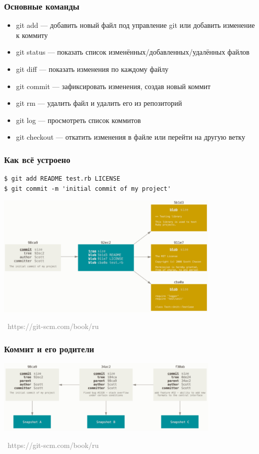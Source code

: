 \documentclass[xetex,mathserif,serif]{beamer}
\newcommand{\attribution}[1] {
\vspace{-5mm}\begin{flushright}\begin{scriptsize}\textcolor{gray}{\textcopyright\, #1}\end{scriptsize}\end{flushright}
}
\begin{document}
	\begin{frame}
		\frametitle{Основные команды}
		\begin{itemize}
			\item git add --- добавить новый файл под управление git или добавить изменение к коммиту
			\item git status --- показать список изменённых/добавленных/удалённых файлов
			\item git diff --- показать изменения по каждому файлу
			\item git commit --- зафиксировать изменения, создав новый коммит
			\item git rm --- удалить файл и удалить его из репозиторий
			\item git log --- просмотреть список коммитов
			\item git checkout --- откатить изменения в файле или перейти на другую ветку
		\end{itemize}
	\end{frame}

	\begin{frame}[fragile]
		\frametitle{Как всё устроено}
		\begin{verbatim}
$ git add README test.rb LICENSE
$ git commit -m 'initial commit of my project'
		\end{verbatim}
		\begin{center}
			\includegraphics[width=0.8\textwidth]{blobs.png}
			\attribution{https://git-scm.com/book/ru}
		\end{center}
	\end{frame}

	\begin{frame}
		\frametitle{Коммит и его родители}
		\begin{center}
			\includegraphics[width=0.8\textwidth]{commits.png}
			\attribution{https://git-scm.com/book/ru}
		\end{center}
	\end{frame}
\end{document}
